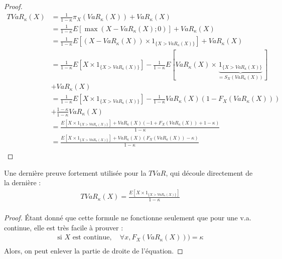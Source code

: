 \begin{proof}
\begin{align*}
TVaR_\kappa(X)  & = \frac{1}{1 - \kappa} \pi_X(VaR_\kappa(X)) + VaR_\kappa(X) \\
    & = \frac{1}{1 - \kappa} E[\max(X - VaR_\kappa(X); 0)] + VaR_\kappa(X) \\
    & = \frac{1}{1 - \kappa} E[(X - VaR_\kappa(X)) \times 1_{\{X > VaR_\kappa(X) \}}] + VaR_\kappa(X) \\
    & = \frac{1}{1 - \kappa} E[X \times 1_{\{X > VaR_\kappa(X) \}}] - \frac{1}{1 - \kappa} E[VaR_\kappa(X) \times \underbrace{1_{\{X > VaR_\kappa(X) \}}}_{= S_X(VaR_\kappa(X))}] \\
    & + VaR_\kappa(X) \\
    & = \frac{1}{1 - \kappa} E[X \times 1_{\{X > VaR_\kappa(X) \}}] - \frac{1}{1 - \kappa} VaR_\kappa(X)(1 - F_X(VaR_\kappa(X))) \\
    & + \frac{1 - \kappa}{1 - \kappa}VaR_\kappa(X) \\
    & = \frac{E[X \times 1_{\{X > VaR_\kappa(X) \}}] + VaR_\kappa(X)(-1 + F_X(VaR_\kappa(X)) + 1 - \kappa)}{1 - \kappa}  \\
    & = \frac{E[X \times 1_{\{X > VaR_\kappa(X) \}}] + VaR_\kappa(X)(F_X(VaR_\kappa(X)) - \kappa)}{1 - \kappa}  \\
\end{align*}
\end{proof}

Une dernière preuve fortement utilisée pour la $TVaR$, qui découle directement de la dernière : 
\begin{align*}
TVaR_\kappa(X) = \frac{E[X \times 1_{\{X > VaR_\kappa(X) \}}]}{1 - \kappa}  \\
\end{align*}


\begin{proof}
Étant donné que cette formule ne fonctionne seulement que pour une v.a. continue, elle est très facile à prouver : 
\begin{align*}
\text{si $X$ est continue}, \quad \forall x, F_X(VaR_\kappa(X))) = \kappa \\
\end{align*}
Alors, on peut enlever la partie de droite de l'équation.
\end{proof}
